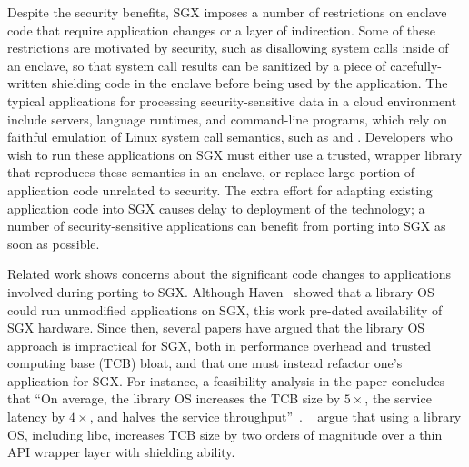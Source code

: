 Despite the security benefits,
SGX imposes a number of restrictions on enclave code 
that require application changes
or a layer of indirection. %
Some of these restrictions are motivated by security, such as disallowing system calls
inside of an enclave, so that system call results can be sanitized by a piece of carefully-written shielding code in the enclave before being used by the application.
The typical applications
for processing security-sensitive data
in a cloud environment
include servers, language runtimes, and
command-line programs,
which rely on faithful emulation of Linux system call semantics, such as  and .
Developers who wish to run these applications on SGX
must either use 
a trusted, wrapper library that reproduces these semantics in an enclave, or replace large portion of application code
unrelated to security.
The extra effort for adapting existing application code
into SGX causes delay to deployment of the technology; a number of  security-sensitive applications
can benefit from porting into SGX as soon as possible.






Related work shows concerns about the significant code changes to applications involved during porting to SGX.
Although Haven~\cite{baumann14haven} showed that a library OS
could run unmodified applications on SGX, this work pre-dated availability of SGX hardware.
Since then, several papers have argued that the library OS approach is impractical for SGX,
both in performance overhead and trusted computing base (TCB) bloat, and that one must instead refactor one's application for SGX.
For instance, a feasibility analysis in the \scone{} paper
concludes that ``On average, the library OS increases the TCB size by $5\times$, the service latency by $4\times$,
and halves the service throughput''~\cite{osdi16scone}.
~\citet{shinde17panoply} argue that using a library OS, including libc, increases TCB size by two orders of magnitude over
a thin API wrapper layer with shielding ability.




